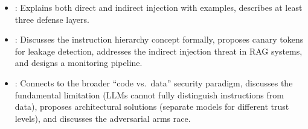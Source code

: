 \begin{interviewq}

\goodgreat
\begin{itemize}
    \item {}: Explains both direct and indirect injection with
    examples, describes at least three defense layers.
    \item {}: Discusses the instruction hierarchy concept formally,
    proposes canary tokens for leakage detection, addresses the indirect
    injection threat in RAG systems, and designs a monitoring pipeline.
    \item {}: Connects to the broader ``code vs.\ data'' security
    paradigm, discusses the fundamental limitation (LLMs cannot fully
    distinguish instructions from data), proposes architectural solutions
    (separate models for different trust levels), and discusses the
    adversarial arms race.
\end{itemize}

\end{interviewq}

\vspace{0.5em}

